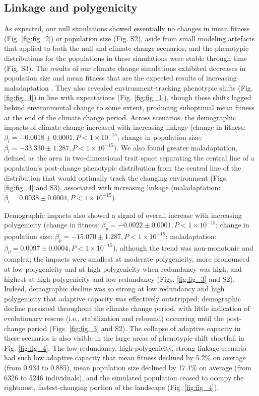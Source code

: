 \documentclass[9pt,twocolumn,twoside,lineno]{pnas-new}
\begin{document}
\subsection{Linkage and polygenicity}
As expected, our null simulations showed essentially no changes
in mean fitness (Fig. \ref{fig:fig_2}) or population size (Fig. S2), aside from small modeling artefacts that applied to both the 
null and climate-change scenarios, and the phenotypic distributions for the populations in these simulations were
stable through time (Fig. S3).
The results of our climate change simulations exhibited
decreases in population size and mean fitness
that are the expected results of increasing maladaptation \cite{aitken_whitlock}.
They also revealed environment-tracking phenotypic shifts (Fig. \ref{fig:fig_4})
in line with expectations (Fig. \ref{fig:fig_1}),
though these shifts lagged behind environmental change to some extent,
producing suboptimal mean fitness at the end of the climate change period.
Across scenarios, the demographic impacts of
climate change increased with increasing linkage
(change in fitness: $\beta_{l} = -0.0018\pm0.0001, P<1\times10^{-15}$;
change in population size: $\beta_{l} = -33.330\pm1.287, P<1\times10^{-15}$).
We also found greater maladaptation, defined as the area in two-dimensional trait space separating the central line
of a population's post-change phenotypic distribution from the central line of the distribution
that would optimally track the changing environment (Figs. \ref{fig:fig_4} and S3), associated with increasing linkage (maladaptation: $\beta_{l} = 0.0038\pm0.0004, P<1\times10^{-15}$).

Demographic impacts also showed a signal of overall increase with increasing polygenicity
(change in fitness: $\beta_{p} = -0.0022\pm0.0001, P<1\times10^{-15}$;
change in population size: $\beta_{p} = -15.070\pm1.287, P<1\times10^{-15}$;
maladaptation: $\beta_{p} = 0.0097\pm0.0004, P<1\times10^{-15}$),
although the trend was non-monotonic and complex; the impacts were smallest at moderate polygenicity,
more pronounced at low polygenicity and at high polygenicity when redundancy was high,
and highest at high polygenicity and low redundancy (Figs. \ref{fig:fig_3} and S2).
Indeed, demographic decline was so strong at low redundancy and high polygenicity
that adaptive capacity was effectively outstripped; demographic decline persisted throughout
the climate change period, with little indication of evolutionary rescue
(i.e., stabilization and rebound) occurring until the post-change period (Figs. \ref{fig:fig_3} and S2).
The collapse of adaptive capacity in these scenarios
is also visible in the large areas of phenotypic-shift shortfall in Fig. \ref{fig:fig_4}.
The low-redundancy, high-polygenicity, strong-linkage scenario had such low adaptive capacity
that mean fitness declined by 5.2\% on average (from 0.934 to 0.885),
mean population size declined by 17.1\% on average (from 6326 to 5246 individuals),
and the simulated population ceased to occupy the rightmost, fastest-changing portion of the landscape (Fig. \ref{fig:fig_4}).
\end{document}
